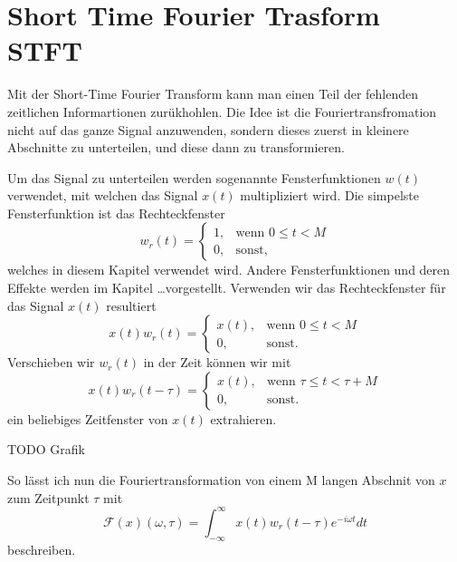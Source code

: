 %
%
%
%
\section{Short Time Fourier Trasform STFT\label{sonogramm:section:teil0}}
Mit der Short-Time Fourier Transform kann man einen Teil der fehlenden zeitlichen Informartionen zurükhohlen.
Die Idee ist die Fouriertransfromation nicht auf das ganze Signal anzuwenden, sondern dieses zuerst in kleinere
Abschnitte zu unterteilen, und diese dann zu transformieren.

Um das Signal zu unterteilen werden sogenannte Fensterfunktionen $w(t)$ verwendet, mit welchen das Signal
$x(t)$ multipliziert wird.
Die simpelste Fensterfunktion ist das Rechteckfenster
\begin{equation}
    w_r(t) = 
        \begin{cases}
        1,& \text{wenn } 0 \le t < M\\
        0, & \text{sonst, }
        \end{cases}
\end{equation}
welches in diesem Kapitel verwendet wird.
Andere Fensterfunktionen und deren Effekte werden im Kapitel \dots vorgestellt.
Verwenden wir das Rechteckfenster für das Signal $x(t)$ resultiert 
\begin{equation}
    x(t) w_r(t) = 
    \begin{cases}
    x(t),& \text{wenn } 0 \le t < M\\
    0, & \text{sonst.}
    \end{cases}
\end{equation}
Verschieben wir $w_r(t)$ in der Zeit können wir mit 
\begin{equation}
    x(t) w_r(t-\tau) = 
    \begin{cases}
        x(t),& \text{wenn } \tau \le t < \tau + M\\
        0, & \text{sonst.}
    \end{cases}
\end{equation}
ein beliebiges Zeitfenster von $x(t)$ extrahieren.

TODO Grafik

So lässt ich nun die Fouriertransformation von einem M langen Abschnit
von $x$ zum Zeitpunkt $\tau$ mit
\begin{equation}
    \mathscr{F}(x)(\omega, \tau) = \int_{-\infty}^{\infty} x(t) w_r(t - \tau) e^{-i \omega t} dt
\end{equation}
beschreiben.


